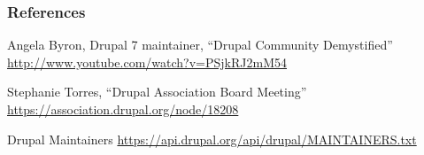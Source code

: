 \begin{frame}
\frametitle{References}


\begin{itemize}
\tiny{
\item Angela Byron, Drupal 7 maintainer, ``Drupal Community Demystified''
 \url{http://www.youtube.com/watch?v=PSjkRJ2mM54}

\item Stephanie Torres, ``Drupal Association Board Meeting''
 \url{https://association.drupal.org/node/18208}

\item Drupal Maintainers
 \url{https://api.drupal.org/api/drupal/MAINTAINERS.txt}


} %
\end{itemize}

\end{frame}
